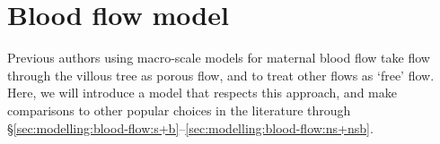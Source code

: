 
    \section{Blood flow model} \label{sec:modelling:blood-flow}        
        Previous authors using macro-scale models for maternal blood flow take flow through the villous tree as porous flow, and to treat other flows as `free' flow. Here, we will introduce a model that respects this approach, and make comparisons to other popular choices in the literature \cite{lecarpentierComputationalFluidDynamic2016,chernyavskyMathematicalModelIntervillous2010,meklerImpactTissuePorosity2022,erianMaternalPlacentalBlood1977,saghianAssociationPlacentalJets2017} through \S\ref{sec:modelling:blood-flow:s+b}--\ref{sec:modelling:blood-flow:ns+nsb}.
            
